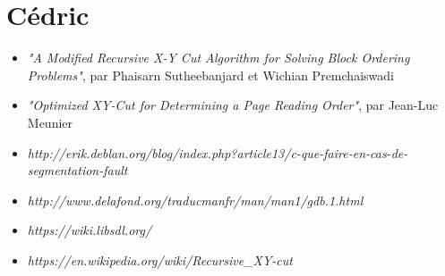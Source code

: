 \documentclass[12pt]{report}
\begin{document}
\section*{Cédric}

\begin{itemize}
	\item \textit{"A Modified Recursive X-Y Cut Algorithm for Solving Block Ordering Problems"}, par Phaisarn Sutheebanjard et Wichian Premchaiswadi
	\item \textit{"Optimized XY-Cut for Determining a Page Reading Order"}, par Jean-Luc Meunier
	\item \textit{http://erik.deblan.org/blog/index.php?article13/c-que-faire-en-cas-de-segmentation-fault}
	\item \textit{http://www.delafond.org/traducmanfr/man/man1/gdb.1.html}
	\item \textit{https://wiki.libsdl.org/}
	\item \textit{https://en.wikipedia.org/wiki/Recursive\_XY-cut}
\end{itemize}

\vfill
\end{document}
